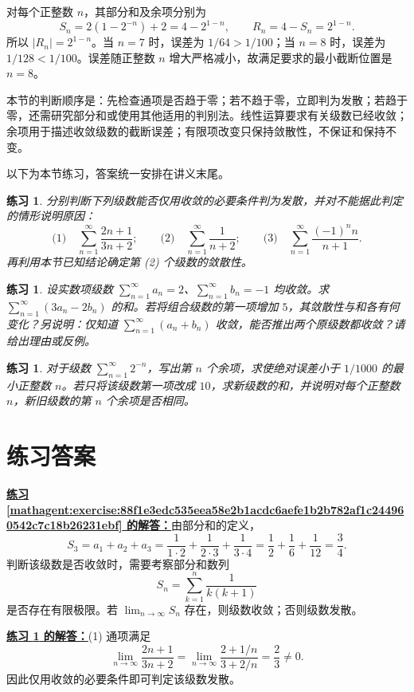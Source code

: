 \documentclass[UTF8,fontset=fandol,11pt]{ctexart}
\newtheorem{exercise}[definition]{练习}
\begin{document}
对每个正整数 $n$，其部分和及余项分别为
\[
S_n=2(1-2^{-n})+2=4-2^{1-n},\qquad
R_n=4-S_n=2^{1-n}.
\]
所以 $|R_n|=2^{1-n}$。当 $n=7$ 时，误差为 $1/64>1/100$；当 $n=8$ 时，误差为 $1/128<1/100$。误差随正整数 $n$ 增大严格减小，故满足要求的最小截断位置是 $n=8$。\par
本节的判断顺序是：先检查通项是否趋于零；若不趋于零，立即判为发散；若趋于零，还需研究部分和或使用其他适用的判别法。线性运算要求有关级数已经收敛；余项用于描述收敛级数的截断误差；有限项改变只保持敛散性，不保证和保持不变。

以下为本节练习，答案统一安排在讲义末尾。\par
\begin{exercise}
\label{mathagent:exercise:e69b7a0304c206dceae958714ab74feb67aaa37cb599d9dda82205d9e3e9f289}
分别判断下列级数能否仅用收敛的必要条件判为发散，并对不能据此判定的情形说明原因：
\[
\text{(1)}\quad\sum_{n=1}^{\infty}\frac{2n+1}{3n+2};\qquad
\text{(2)}\quad\sum_{n=1}^{\infty}\frac1{n+2};\qquad
\text{(3)}\quad\sum_{n=1}^{\infty}\frac{(-1)^n n}{n+1}.
\]
再利用本节已知结论确定第 (2) 个级数的敛散性。
\end{exercise}
\begin{exercise}
\label{mathagent:exercise:fae67726e3f6b1d71e0285711b2976ac356374939815f4c70d1ae93b03238b0b}
设实数项级数 $\sum_{n=1}^{\infty}a_n=2$、$\sum_{n=1}^{\infty}b_n=-1$ 均收敛。求 $\sum_{n=1}^{\infty}(3a_n-2b_n)$ 的和。若将组合级数的第一项增加 $5$，其敛散性与和各有何变化？另说明：仅知道 $\sum_{n=1}^{\infty}(a_n+b_n)$ 收敛，能否推出两个原级数都收敛？请给出理由或反例。
\end{exercise}
\begin{exercise}
\label{mathagent:exercise:da9ebfc8f5e631cba145a91d6f8cb2ebfd5769c096981b72d3d911dc8b435e5d}
对于级数 $\sum_{n=1}^{\infty}2^{-n}$，写出第 $n$ 个余项，求使绝对误差小于 $1/1000$ 的最小正整数 $n$。若只将该级数第一项改成 $10$，求新级数的和，并说明对每个正整数 $n$，新旧级数的第 $n$ 个余项是否相同。
\end{exercise}
\section*{练习答案}
\par\noindent\textbf{\hyperref[mathagent:exercise:88f1e3edc535eea58e2b1acdc6aefe1b2b782af1c244960542c7c18b26231ebf]{练习 \ref*{mathagent:exercise:88f1e3edc535eea58e2b1acdc6aefe1b2b782af1c244960542c7c18b26231ebf} 的解答：}}由部分和的定义，
\[
S_3=a_1+a_2+a_3
=\frac{1}{1\cdot2}+\frac{1}{2\cdot3}+\frac{1}{3\cdot4}
=\frac12+\frac16+\frac1{12}
=\frac34.
\]
判断该级数是否收敛时，需要考察部分和数列
\[
S_n=\sum_{k=1}^{n}\frac{1}{k(k+1)}
\]
是否存在有限极限。若 $\lim_{n\to\infty}S_n$ 存在，则级数收敛；否则级数发散。\par
\par\noindent\textbf{\hyperref[mathagent:exercise:e69b7a0304c206dceae958714ab74feb67aaa37cb599d9dda82205d9e3e9f289]{练习 \ref*{mathagent:exercise:e69b7a0304c206dceae958714ab74feb67aaa37cb599d9dda82205d9e3e9f289} 的解答：}}(1) 通项满足
\[
\lim_{n\to\infty}\frac{2n+1}{3n+2}
=\lim_{n\to\infty}\frac{2+1/n}{3+2/n}=\frac23\ne0.
\]
因此仅用收敛的必要条件即可判定该级数发散。
\end{document}
